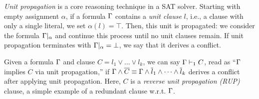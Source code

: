 %
%
%
\emph{Unit propagation} is a core reasoning technique in a SAT solver. Starting
with empty assignment $\alpha$, if a formula $\Gamma$ contains a \emph{unit
clause} $l$, i.e., a clause with only a single literal, we set $\alpha(l) =
\top$. Then, this unit is propagated: we consider the formula $\Gamma|_\alpha$
and continue this process until no unit clauses remain. If unit propagation
terminates with $\Gamma|_\alpha = \bot$, we say that it derives a conflict.
%
%

Given a formula $\Gamma$ and clause $C = l_1 \lor \dots \lor l_k$, we can say
$\Gamma \vdash_1 C$, read as ``$\Gamma$ implies $C$ via unit propagation,''
if $\Gamma \land \overline{C} \equiv \Gamma \land \overline{l}_1 \land \dots
\land \overline{l}_k$ derives a conflict after applying unit propagation. 
Here, $C$ is a \emph{reverse unit propagation (RUP)}
clause, a simple example of a redundant clause w.r.t. $\Gamma$. 


